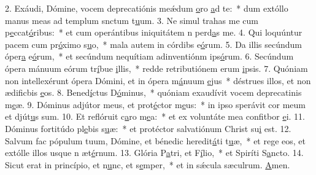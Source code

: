 2. Exáudi, Dómine, vocem deprecatiónis meǽdum \uline{o}ro \uline{a}d te:~* dum extóllo manus meas ad templum snctum t\uline{u}um.
3. Ne simul trahas me cum p\uline{e}ccat\uline{ó}ribus:~* et cum operántibus iniquitátem n perd\uline{a}s me.
4. Qui loquúntur pacem cum pr\uline{ó}ximo s\uline{u}o,~* mala autem in córdibs e\uline{ó}rum.
5. Da illis secúndum óper\uline{a} e\uline{ó}rum,~* et secúndum nequítiam adinventiónm ips\uline{ó}rum.
6. Secúndum ópera mánuum eórum tr\uline{í}bue \uline{i}llis,~* redde retributiónem erum \uline{i}psis.
7. Quóniam non intellexérunt ópera Dómini, et in ópera m\uline{á}nuum \uline{e}jus~* déstrues illos, et non ædificbis \uline{e}os.
8. Bened\uline{í}ctus D\uline{ó}minus,~* quóniam exaudívit vocem deprecatinis m\uline{e}æ.
9. Dóminus adjútor meus, et prot\uline{é}ctor m\uline{e}us:~* in ipso sperávit cor meum et djút\uline{u}s sum.
10. Et reflóruit c\uline{a}ro m\uline{e}a:~* et ex voluntáte mea confitbor \uline{e}i.
11. Dóminus fortitúdo pl\uline{e}bis s\uline{u}æ:~* et protéctor salvatiónum Christ su\uline{i} est.
12. Salvum fac pópulum tuum, Dómine, et bénedic heredit\uline{á}ti t\uline{u}æ,~* et rege eos, et extólle illos usque n æt\uline{é}rnum.
13. Glória P\uline{a}tri, et F\uline{í}lio,~* et Spiríti S\uline{a}ncto.
14. Sicut erat in princípio, et n\uline{u}nc, et s\uline{e}mper,~* et in sǽcula sæculrum. \uline{A}men.
